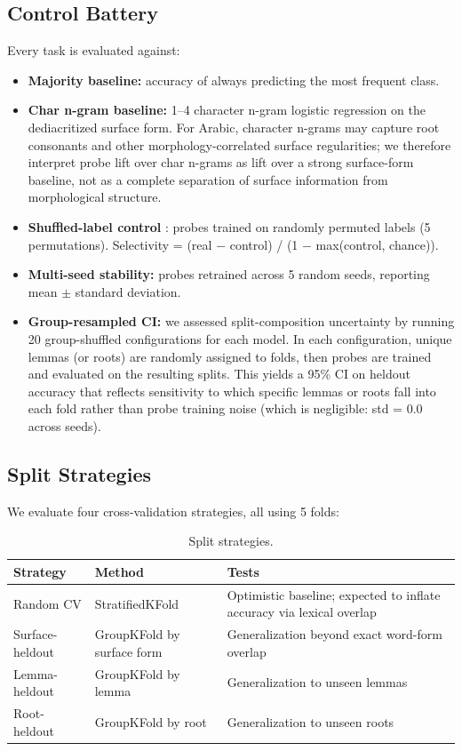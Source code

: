 \documentclass[11pt,a4paper]{article}
\begin{document}
\subsection{Control Battery}
Every task is evaluated against:
\begin{itemize}
\item \textbf{Majority baseline:} accuracy of always predicting the most frequent class.
\item \textbf{Char n-gram baseline:} 1--4 character n-gram logistic regression on the dediacritized surface form. For Arabic, character n-grams may capture root consonants and other morphology-correlated surface regularities; we therefore interpret probe lift over char n-grams as lift over a strong surface-form baseline, not as a complete separation of surface information from morphological structure.
\item \textbf{Shuffled-label control} \citep{hewitt-liang-2019}: probes trained on randomly permuted labels (5 permutations). Selectivity = (real $-$ control) / (1 $-$ max(control, chance)).
\item \textbf{Multi-seed stability:} probes retrained across 5 random seeds, reporting mean $\pm$ standard deviation.
\item \textbf{Group-resampled CI:} we assessed split-composition uncertainty by running 20 group-shuffled configurations for each model. In each configuration, unique lemmas (or roots) are randomly assigned to folds, then probes are trained and evaluated on the resulting splits. This yields a 95\% CI on heldout accuracy that reflects sensitivity to which specific lemmas or roots fall into each fold rather than probe training noise (which is negligible: std = 0.0 across seeds).
\end{itemize}

\subsection{Split Strategies}
We evaluate four cross-validation strategies, all using 5 folds:

\begin{table}
\centering\small
\caption{Split strategies.}
\begin{tabular}{lll}
\toprule
Strategy & Method & Tests \\
\midrule
Random CV & StratifiedKFold & Optimistic baseline; expected to inflate accuracy via lexical overlap \\
Surface-heldout & GroupKFold by surface form & Generalization beyond exact word-form overlap \\
Lemma-heldout & GroupKFold by lemma & Generalization to unseen lemmas \\
Root-heldout & GroupKFold by root & Generalization to unseen roots \\
\bottomrule
\end{tabular}
\end{table}
\end{document}
